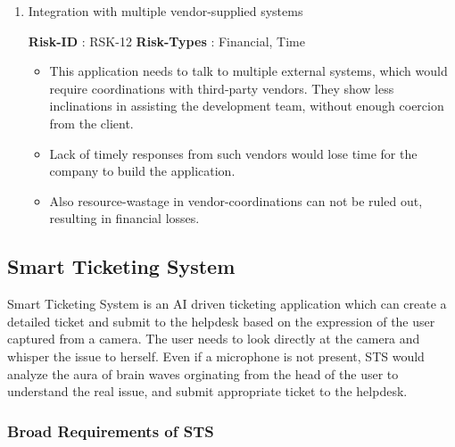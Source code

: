 \documentclass{article}%
\makeatletter
\newcommand{\tinytosmall}{%
  \fontsize
    {\fpeval{(\f@size@tiny+\f@size@small)/2}}
    {\fpeval{(\f@baselineskip@tiny+\f@baselineskip@small)/2}}%
  \selectfont
}
\makeatother
\begin{document}
\begin{enumerate}
\begin{fancybox}{\small \faChevronCircleRight \normalsize \xspace %
\tinytosmall%
\textbf{Risk{-}ID}%
: %
\xspace%
RSK{-}11%
\normalsize%
}
\begin{itemize}
The cost of resources might jump{-}up during the course of execution of the project.%
\end{itemize}%
\end{fancybox}%
\item%
\hypertarget{ID:1157175407}{}%
Integration with multiple vendor{-}supplied systems%
\begin{fancybox}{\small \faChevronCircleRight \normalsize \xspace %
\tinytosmall%
\textbf{Risk{-}ID}%
: %
\xspace%
RSK{-}12%
\normalsize%
}%
\tinytosmall%
\textbf{Risk{-}Types}%
: %
\xspace%
Financial, Time%
\normalsize%
\begin{itemize}%
\item%
This application needs to talk to multiple external systems, which would require coordinations with third{-}party vendors. They show less inclinations in assisting the development team, without enough coercion from the client.%
\item%
Lack of timely responses from such vendors would lose time for the company to build the application.%
\item%
Also resource{-}wastage in vendor{-}coordinations can not be ruled out, resulting in financial losses.%
\end{itemize}%
\end{fancybox}%
\end{enumerate}%
\hypertarget{ID:1448897481}{}%
\subsection{Smart Ticketing System}%

%
Smart Ticketing System is an AI driven ticketing application which can create a detailed ticket and submit to the helpdesk based on the expression of the user captured from a camera. The user needs to look directly at the camera and whisper the issue to herself. Even if a microphone is not present, STS would analyze the aura of brain waves orginating from the head of the user to understand the real issue, and submit appropriate ticket to the helpdesk.%
\hypertarget{ID:1725597443}{}%
\subsubsection{Broad Requirements of STS}%
\end{document}
